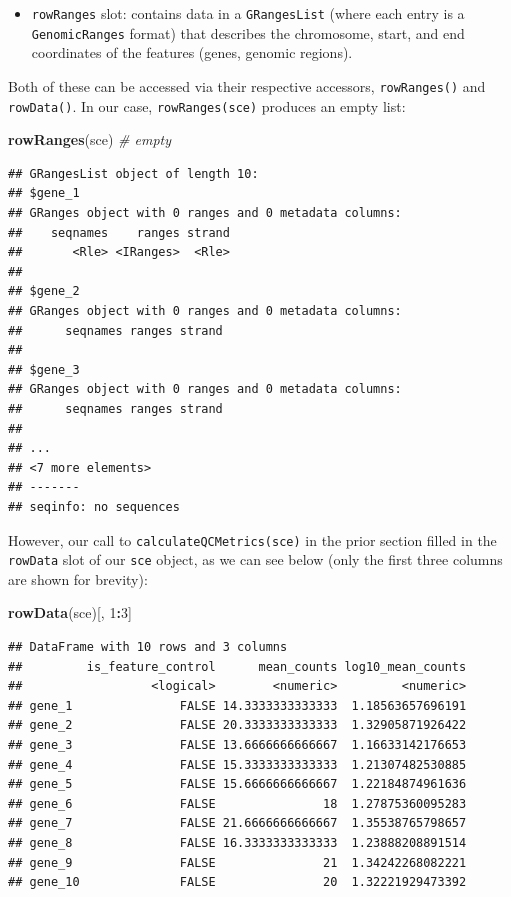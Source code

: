 \documentclass[]{book}
\newenvironment{Shaded}{\begin{snugshade}}{\end{snugshade}}
\newcommand{\CommentTok}[1]{\textcolor[rgb]{0.56,0.35,0.01}{\textit{#1}}}
\newcommand{\DecValTok}[1]{\textcolor[rgb]{0.00,0.00,0.81}{#1}}
\newcommand{\KeywordTok}[1]{\textcolor[rgb]{0.13,0.29,0.53}{\textbf{#1}}}
\newcommand{\NormalTok}[1]{#1}
\newcommand{\OperatorTok}[1]{\textcolor[rgb]{0.81,0.36,0.00}{\textbf{#1}}}
\providecommand{\tightlist}{%
  \setlength{\itemsep}{0pt}\setlength{\parskip}{0pt}}
\begin{document}
\begin{itemize}
\tightlist
\item
  \texttt{rowRanges} slot: contains data in a \texttt{GRangesList} (where each entry is a \texttt{GenomicRanges} format) that describes the chromosome, start, and end coordinates of the features (genes, genomic regions).
\end{itemize}

Both of these can be accessed via their respective accessors, \texttt{rowRanges()} and \texttt{rowData()}. In our case, \texttt{rowRanges(sce)} produces an empty list:

\begin{Shaded}
\begin{Highlighting}[]
\KeywordTok{rowRanges}\NormalTok{(sce) }\CommentTok{# empty}
\end{Highlighting}
\end{Shaded}

\begin{verbatim}
## GRangesList object of length 10:
## $gene_1 
## GRanges object with 0 ranges and 0 metadata columns:
##    seqnames    ranges strand
##       <Rle> <IRanges>  <Rle>
## 
## $gene_2 
## GRanges object with 0 ranges and 0 metadata columns:
##      seqnames ranges strand
## 
## $gene_3 
## GRanges object with 0 ranges and 0 metadata columns:
##      seqnames ranges strand
## 
## ...
## <7 more elements>
## -------
## seqinfo: no sequences
\end{verbatim}

However, our call to \texttt{calculateQCMetrics(sce)} in the prior section filled in the \texttt{rowData} slot of our \texttt{sce} object, as we can see below (only the first three columns are shown for brevity):

\begin{Shaded}
\begin{Highlighting}[]
\KeywordTok{rowData}\NormalTok{(sce)[, }\DecValTok{1}\OperatorTok{:}\DecValTok{3}\NormalTok{]}
\end{Highlighting}
\end{Shaded}

\begin{verbatim}
## DataFrame with 10 rows and 3 columns
##         is_feature_control      mean_counts log10_mean_counts
##                  <logical>        <numeric>         <numeric>
## gene_1               FALSE 14.3333333333333  1.18563657696191
## gene_2               FALSE 20.3333333333333  1.32905871926422
## gene_3               FALSE 13.6666666666667  1.16633142176653
## gene_4               FALSE 15.3333333333333  1.21307482530885
## gene_5               FALSE 15.6666666666667  1.22184874961636
## gene_6               FALSE               18  1.27875360095283
## gene_7               FALSE 21.6666666666667  1.35538765798657
## gene_8               FALSE 16.3333333333333  1.23888208891514
## gene_9               FALSE               21  1.34242268082221
## gene_10              FALSE               20  1.32221929473392
\end{verbatim}
\end{document}
